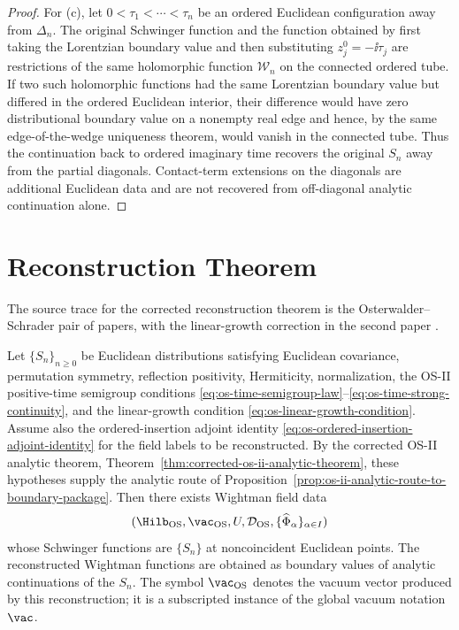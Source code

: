 \begin{proof}
For (c), let \(0<\tau_1<\cdots<\tau_n\) be an ordered Euclidean
configuration away from \(\Delta_n\).  The original Schwinger function and
the function obtained by first taking the Lorentzian boundary value and then
substituting \(z_j^0=-\ii\tau_j\) are restrictions of the same holomorphic
function \(\mathcal W_n\) on the connected ordered tube.  If two such
holomorphic functions had the same Lorentzian boundary value but differed in
the ordered Euclidean interior, their difference would have zero
distributional boundary value on a nonempty real edge and hence, by the same
edge-of-the-wedge uniqueness theorem, would vanish in the connected tube.
Thus the continuation back to ordered imaginary time recovers the original
\(S_n\) away from the partial diagonals.  Contact-term extensions on the
diagonals are additional Euclidean data and are not recovered from
off-diagonal analytic continuation alone.
\end{proof}

\section{Reconstruction Theorem}

The source trace for the corrected reconstruction theorem is the
Osterwalder--Schrader pair of papers, with the linear-growth correction in the
second paper \cite{OS1973,OS1975}.

\begin{theorem}
\label{thm:os-reconstruction}
Let \(\{S_n\}_{n\ge0}\) be Euclidean distributions satisfying Euclidean
covariance, permutation symmetry, reflection positivity, Hermiticity,
normalization, the OS-II positive-time semigroup conditions
\eqref{eq:os-time-semigroup-law}--\eqref{eq:os-time-strong-continuity}, and
the linear-growth condition \eqref{eq:os-linear-growth-condition}.  Assume
also the ordered-insertion adjoint identity
\eqref{eq:os-ordered-insertion-adjoint-identity} for the field labels to be
reconstructed.  By the
corrected OS-II analytic theorem,
Theorem~\ref{thm:corrected-os-ii-analytic-theorem}, these hypotheses supply
the analytic route of
Proposition~\ref{prop:os-ii-analytic-route-to-boundary-package}.  Then there exists
Wightman field data
\[
  (\Hilb_{\rm OS},\vac_{\rm OS},U,\mathcal D_{\rm OS},
  \{\widehat\Phi_\alpha\}_{\alpha\in I})
\]
whose Schwinger functions are \(\{S_n\}\) at noncoincident Euclidean points.
The reconstructed Wightman functions are obtained as boundary values of
analytic continuations of the \(S_n\).
The symbol \(\vac_{\rm OS}\) denotes the vacuum vector produced by this
reconstruction; it is a subscripted instance of the global vacuum notation
\(\vac\).
\end{theorem}

